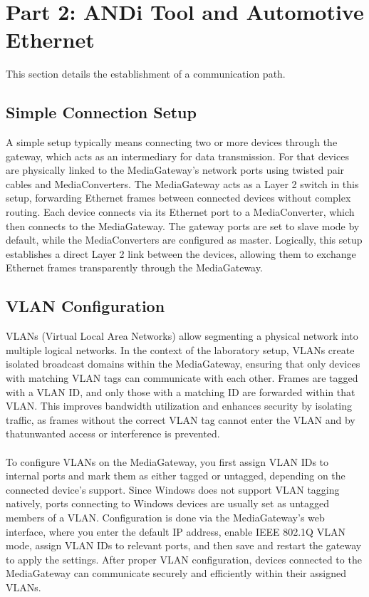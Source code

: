 \section{Part 2: ANDi Tool and Automotive Ethernet }
\label{sec:mediagateway}

This section details the establishment of a communication path.

\subsection{Simple Connection Setup}
A simple setup typically means connecting two or more devices through the gateway, which acts as an intermediary for data transmission. For that devices are physically linked to the MediaGateway’s network ports using twisted pair cables and MediaConverters. The MediaGateway acts as a Layer 2 switch in this setup, forwarding Ethernet frames between connected devices without complex routing. Each device connects via its Ethernet port to a MediaConverter, which then connects to the MediaGateway. The gateway ports are set to slave mode by default, while the MediaConverters are configured as master. Logically, this setup establishes a direct Layer 2 link between the devices, allowing them to exchange Ethernet frames transparently through the MediaGateway.

\subsection{VLAN Configuration}
VLANs (Virtual Local Area Networks) allow segmenting a physical network into multiple logical networks. In the context of the laboratory setup, VLANs create isolated broadcast domains within the MediaGateway, ensuring that only devices with matching VLAN tags can communicate with each other. Frames are tagged with a VLAN ID, and only those with a matching ID are forwarded within that VLAN. This improves bandwidth utilization and enhances security by isolating traffic, as frames without the correct VLAN tag cannot enter the VLAN and by thatunwanted access or interference is prevented.\\\\
To configure VLANs on the MediaGateway, you first assign VLAN IDs to internal ports and mark them as either tagged or untagged, depending on the connected device’s support. Since Windows does not support VLAN tagging natively, ports connecting to Windows devices are usually set as untagged members of a VLAN. Configuration is done via the MediaGateway’s web interface, where you enter the default IP address, enable IEEE 802.1Q VLAN mode, assign VLAN IDs to relevant ports, and then save and restart the gateway to apply the settings. After proper VLAN configuration, devices connected to the MediaGateway can communicate securely and efficiently within their assigned VLANs.\\\\

